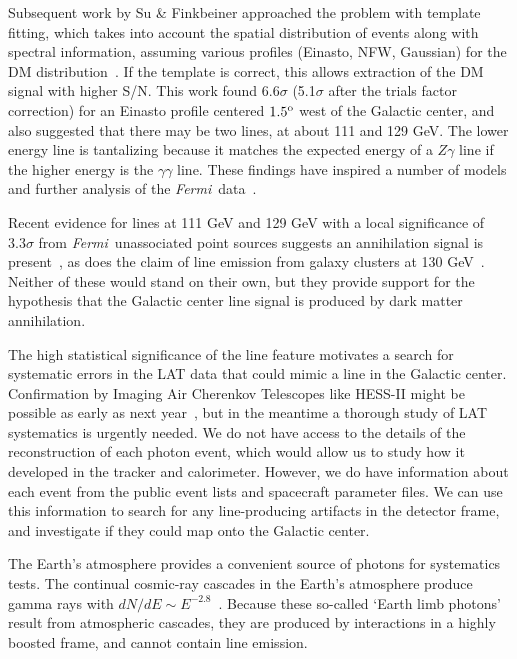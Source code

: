 \documentclass[aps,prd,superscriptaddress,showpacs]{revtex4}
\newcommand{\Fermi}{{\slshape Fermi}}
\newcommand{\degree}{^{\rm o}}
\begin{document}
Subsequent work by Su \& Finkbeiner approached the problem
with template fitting, which takes into account the spatial
distribution of events along with spectral information,
assuming various profiles (Einasto, NFW, Gaussian) for the
DM distribution~\citep{linepaper}.  If the template is
correct, this allows extraction of the DM signal with higher
S/N.  This work found 6.6$\sigma$ (5.1$\sigma$ after the
trials factor correction) for an Einasto profile centered
$1.5\degree$ west of the Galactic center, and also suggested
that there may be two lines, at about 111 and 129 GeV.  The
lower energy line is tantalizing because it matches the
expected energy of a $Z\gamma$ line if the higher energy is
the $\gamma\gamma$ line.  These findings have inspired a
number of models and further analysis of the \Fermi\
data~\citep{Dudas:2012, Choi:2012, Kyae:2012, Lee:2012,
Rajaraman:2012, Acharya:2012, Garny:2012, Buckley:2012,
Chu:2012, Kang:2012, Buchmuller:2012, Bergstrom:2012b,
Heo:2012, Park:2012, Tulin:2012, Cline:2012, Weiner:2012,
WeinerYavin:2012b, FanReece:2012, Huang:2012, Whiteson:2012,
Buchmuller:2012, Cholis:2012}.

Recent evidence for lines at 111 GeV and 129 GeV with a
local significance of $3.3\sigma$ from \Fermi\ unassociated
point sources suggests an annihilation signal is
present~\cite{doubleline}\citep[but
see][]{HooperLinden:2012b}, as does the claim of line
emission from galaxy clusters at 130
GeV~\cite{Hektor:2012kc}.  Neither of these would stand on
their own, but they provide support for the hypothesis that
the Galactic center line signal is produced by dark matter
annihilation.

The high statistical significance of the line feature
motivates a search for systematic errors in the LAT data
that could mimic a line in the Galactic center.
Confirmation by Imaging Air Cherenkov Telescopes like
HESS-II might be possible as early as next
year~\cite{Bergstrom:2012}, but in the meantime a thorough
study of LAT systematics is urgently needed.  We do not have
access to the details of the reconstruction of each photon
event, which would allow us to study how it developed in the
tracker and calorimeter.  However, we do have information
about each event from the public event lists and spacecraft
parameter files.  We can use this information to search for
any line-producing artifacts in the detector frame, and
investigate if they could map onto the Galactic center.

The Earth's atmosphere provides a convenient source of
photons for systematics tests.  The continual cosmic-ray
cascades in the Earth's atmosphere produce gamma rays with
$dN/dE \sim E^{-2.8}$~\citep{FermiLimb}.  Because these
so-called `Earth limb photons' result from atmospheric
cascades, they are produced by interactions in a highly
boosted frame, and cannot contain line emission.
\medskip
\end{document}
